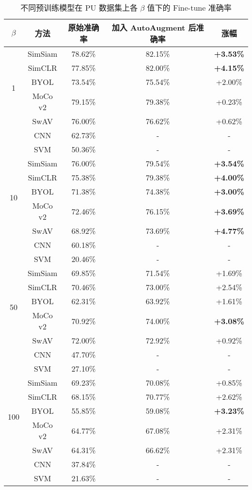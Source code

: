 \documentclass[master]{thesis-uestc}
\begin{document}
\begin{table}[!h]
    \caption{不同预训练模型在 PU 数据集上各 $\beta$ 值下的 Fine-tune 准确率}
    \centering
    \renewcommand\arraystretch{1.2}
    \begin{tabular}{ccccc}
    \toprule
    $\beta$ & 方法 & 原始准确率 & 加入 AutoAugment 后准确率 & 涨幅 \\
    \midrule
    \multirow{5}{*}{1}   
        & SimSiam  & 78.62\% & 82.15\% & \textbf{+3.53\%} \\
        & SimCLR   & 77.85\% & 82.00\% & \textbf{+4.15\%} \\
        & BYOL     & 73.54\% & 75.54\% & +2.00\% \\
        & MoCo v2  & 79.15\% & 79.38\% & +0.23\% \\
        & SwAV     & 76.00\% & 76.62\% & +0.62\% \\
        & CNN     & 62.73\% & -      & - \\
        & SVM     & 50.36\% & -      & - \\
    \midrule
    \multirow{5}{*}{10}  
        & SimSiam  & 76.00\% & 79.54\% & \textbf{+3.54\%} \\
        & SimCLR   & 75.38\% & 79.38\% & \textbf{+4.00\%} \\
        & BYOL     & 71.38\% & 74.38\% & \textbf{+3.00\%} \\
        & MoCo v2  & 72.46\% & 76.15\% & \textbf{+3.69\%} \\
        & SwAV     & 68.92\% & 73.69\% & \textbf{+4.77\%} \\
        & CNN     & 60.18\% & -      & - \\
        & SVM     & 20.46\% & -      & - \\
    \midrule
    \multirow{5}{*}{50} 
        & SimSiam  & 69.85\% & 71.54\% & +1.69\% \\
        & SimCLR   & 70.46\% & 73.00\% & +2.54\% \\
        & BYOL     & 62.31\% & 63.92\% & +1.61\% \\
        & MoCo v2  & 70.92\% & 74.00\% & \textbf{+3.08\%} \\
        & SwAV     & 72.00\% & 72.92\% & +0.92\% \\
        & CNN     & 47.70\% & -      & - \\
        & SVM     & 27.10\% & -      & - \\
    \midrule
    \multirow{5}{*}{100}  
        & SimSiam  & 69.23\% & 70.08\% & +0.85\% \\
        & SimCLR   & 68.15\% & 70.77\% & +2.62\% \\
        & BYOL     & 55.85\% & 59.08\% & \textbf{+3.23\%} \\
        & MoCo v2  & 64.77\% & 67.08\% & +2.31\% \\
        & SwAV     & 64.31\% & 66.62\% & +2.31\% \\
        & CNN     & 37.84\% & -      & - \\
        & SVM     & 21.63\% & -      & - \\
    \bottomrule
    \end{tabular}
    \label{tab:longtail_autoaugment_comparison_pu}
\end{table}
\FloatBarrier
\end{document}
